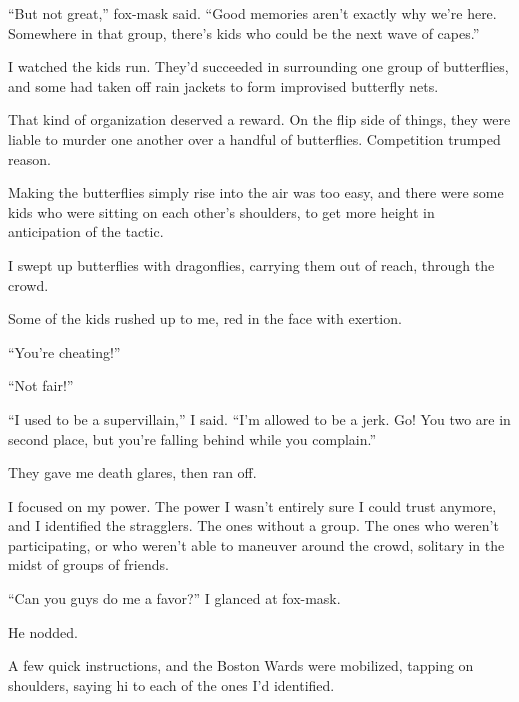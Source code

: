 ``But not great,'' fox-mask said.  ``Good memories aren't exactly why we're here.  Somewhere in that group, there's kids who could be the next wave of capes.''



I watched the kids run.  They'd succeeded in surrounding one group of butterflies, and some had taken off rain jackets to form improvised butterfly nets.



That kind of organization deserved a reward.  On the flip side of things, they were liable to murder one another over a handful of butterflies.  Competition trumped reason.



Making the butterflies simply rise into the air was too easy, and there were some kids who were sitting on each other's shoulders, to get more height in anticipation of the tactic.



I swept up butterflies with dragonflies, carrying them out of reach, through the crowd.



Some of the kids rushed up to me, red in the face with exertion.



``You're cheating!''



``Not fair!''



``I used to be a supervillain,'' I said.  ``I'm allowed to be a jerk.  Go!  You two are in second place, but you're falling behind while you complain.''



They gave me death glares, then ran off.



I focused on my power.  The power I wasn't entirely sure I could trust anymore, and I identified the stragglers.  The ones without a group.  The ones who weren't participating, or who weren't able to maneuver around the crowd, solitary in the midst of groups of friends.



``Can you guys do me a favor?'' I glanced at fox-mask.



He nodded.



A few quick instructions, and the Boston Wards were mobilized, tapping on shoulders, saying hi to each of the ones I'd identified.



